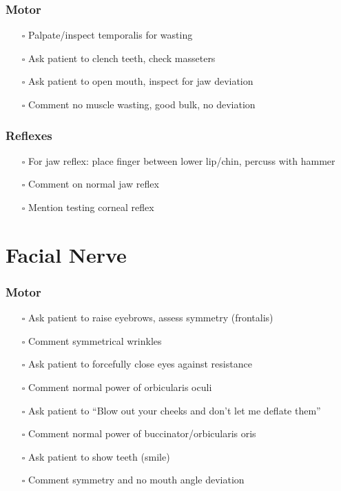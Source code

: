 \documentclass[
  13.5pt,
  a4paper,
  DIV=11,
  numbers=noendperiod]{scrreprt}
\providecommand{\tightlist}{%
  \setlength{\itemsep}{0pt}\setlength{\parskip}{0pt}}
\begin{document}
\subsubsection{Motor}\label{motor}

\begin{itemize}
\tightlist
\item[$\square$]
  Palpate/inspect temporalis for wasting
\item[$\square$]
  Ask patient to clench teeth, check masseters
\item[$\square$]
  Ask patient to open mouth, inspect for jaw deviation
\item[$\square$]
  Comment no muscle wasting, good bulk, no deviation
\end{itemize}

\subsubsection{Reflexes}\label{reflexes}

\begin{itemize}
\tightlist
\item[$\square$]
  For jaw reflex: place finger between lower lip/chin, percuss with
  hammer
\item[$\square$]
  Comment on normal jaw reflex
\item[$\square$]
  Mention testing corneal reflex
\end{itemize}

\section{Facial Nerve}\label{facial-nerve}

\subsubsection{Motor}\label{motor-1}

\begin{itemize}
\tightlist
\item[$\square$]
  Ask patient to raise eyebrows, assess symmetry (frontalis)
\item[$\square$]
  Comment symmetrical wrinkles
\item[$\square$]
  Ask patient to forcefully close eyes against resistance
\item[$\square$]
  Comment normal power of orbicularis oculi
\item[$\square$]
  Ask patient to ``Blow out your cheeks and don't let me deflate them''
\item[$\square$]
  Comment normal power of buccinator/orbicularis oris
\item[$\square$]
  Ask patient to show teeth (smile)
\item[$\square$]
  Comment symmetry and no mouth angle deviation
\end{itemize}
\end{document}
